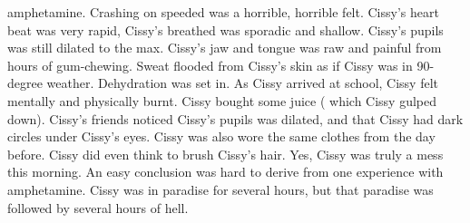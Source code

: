 \documentclass[12pt]{book}
\begin{document}
amphetamine. Crashing on speeded was a horrible, horrible felt. Cissy's heart beat was very rapid, Cissy's breathed was sporadic and shallow. Cissy's pupils was still dilated to the max. Cissy's jaw and tongue was raw and painful from hours of gum-chewing. Sweat flooded from Cissy's skin as if Cissy was in 90-degree weather. Dehydration was set in. As Cissy arrived at school, Cissy felt mentally and physically burnt. Cissy bought some juice ( which Cissy gulped down). Cissy's friends noticed Cissy's pupils was dilated, and that Cissy had dark circles under Cissy's eyes. Cissy was also wore the same clothes from the day before. Cissy did even think to brush Cissy's hair. Yes, Cissy was truly a mess this morning. An easy conclusion was hard to derive from one experience with amphetamine. Cissy was in paradise for several hours, but that paradise was followed by several hours of hell.
\end{document}
